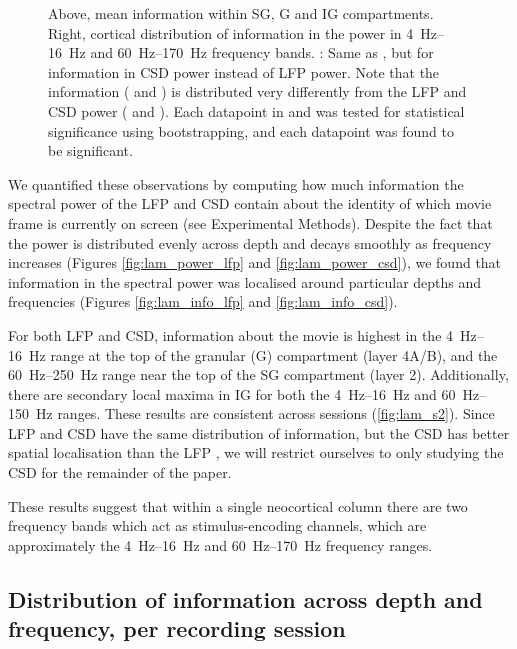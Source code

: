 \begin{figure}[htbp]
{Above, mean information within \ac{SG}, \ac{G} and \ac{IG} compartments.
Right, cortical distribution of information in the power in \SIrange{4}{16}{Hz} and \SIrange{60}{170}{Hz} frequency bands.
\protect{}: Same as \protect{}, but for information in \ac{CSD} power instead of \ac{LFP} power.
Note that the information (\protect{} and \protect{}) is distributed very differently from the \ac{LFP} and \ac{CSD} power (\protect{} and \protect{}).
Each datapoint in \protect{} and \protect{} was tested for statistical significance using bootstrapping, and each datapoint was found to be significant.
    \label{fig:lam_info}
    \label{fig:lam_2}
}
\end{figure}

We quantified these observations by computing how much information the spectral power of the \ac{LFP} and \ac{CSD} contain about the identity of which movie frame is currently on screen (see Experimental Methods).
Despite the fact that the power is distributed evenly across depth and decays smoothly as frequency increases (Figures \ref{fig:lam_power_lfp} and \ref{fig:lam_power_csd}), we found that information in the spectral power was localised around particular depths and frequencies (Figures \ref{fig:lam_info_lfp} and \ref{fig:lam_info_csd}).

For both \ac{LFP} and \ac{CSD}, information about the movie is highest in the \SIrange{4}{16}{Hz} range at the top of the granular (\ac{G}) compartment (layer 4A/B), and the \SIrange{60}{250}{Hz} range near the top of the \ac{SG} compartment (layer 2).
Additionally, there are secondary local maxima in \ac{IG} for both the \SIrange{4}{16}{Hz} and \SIrange{60}{150}{Hz} ranges.
These results are consistent across sessions (\autoref{fig:lam_s2}).
Since \ac{LFP} and \ac{CSD} have the same distribution of information, but the \ac{CSD} has better spatial localisation than the \ac{LFP} \citep{Einevoll2013,Kajikawa2011}, we will restrict ourselves to only studying the \ac{CSD} for the remainder of the paper.

These results suggest that within a single neocortical column there are two frequency bands which act as stimulus-encoding channels, which are approximately the \SIrange{4}{16}{Hz} and \SIrange{60}{170}{Hz} frequency ranges.


\subsection{Distribution of information across depth and frequency, per recording session}

